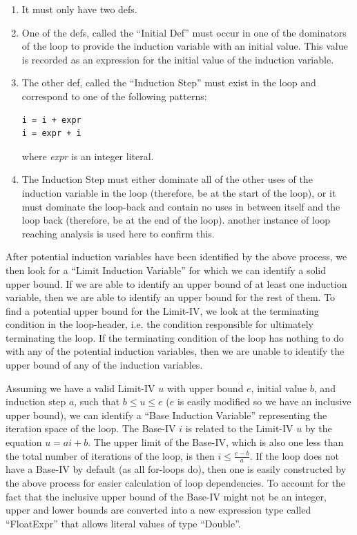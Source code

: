 \documentclass[11pt]{article}
\begin{document}
\begin{enumerate} 

\item It must only have two defs. 

\item One of the defs, called the ``Initial Def'' must occur in one of the
  dominators of the loop to provide the induction variable with an
  initial value. This value is recorded as an expression for the
  initial value of the induction variable. 

\item The other def, called the ``Induction Step'' must exist in the
  loop and correspond to one of the following patterns: 
\begin{verbatim}
i = i + expr 
i = expr + i
\end{verbatim}
where \emph{expr} is an integer literal. 

\item The Induction Step must either dominate all of the other uses of
  the induction variable in the loop (therefore, be at the start of
  the loop), or it must dominate the loop-back and contain no uses in
  between itself and the loop back (therefore, be at the end of the
  loop). another instance of loop reaching analysis is used here to
  confirm this. 

\end{enumerate} 

After potential induction variables have been identified by the above
process, we then look for a ``Limit Induction Variable'' for which we
can identify a solid upper bound. If we are able to identify an upper
bound of at least one induction variable, then we are able to identify
an upper bound for the rest of them. To find a potential upper bound
for the Limit-IV, we look at the terminating condition in the
loop-header, i.e. the condition responsible for ultimately terminating
the loop. If the terminating condition of the loop has nothing to do
with any of the potential induction variables, then we are unable to
identify the upper bound of any of the induction variables. 

Assuming we have a valid Limit-IV $u$ with upper bound $e$, initial value
$b$, and induction step $a$, such that $b \leq u \leq e$ ($e$ is easily
modified so we have an inclusive upper bound), we can identify a
``Base Induction Variable'' representing the iteration space of the
loop. The Base-IV $i$ is related to the Limit-IV $u$ by the equation
$u = ai + b$. The upper limit of the Base-IV, which is also one less than the total
number of iterations of the loop, is then $i \leq \frac{e-b}{a}$. If
the loop does not have a Base-IV by default (as all for-loops do),
then one is easily constructed by the above process for easier
calculation of loop dependencies. To account for the fact that the
inclusive upper bound of the Base-IV might not be an integer, upper
and lower bounds are converted into a new expression type called
``FloatExpr'' that allows literal values of type ``Double''.
\end{document}
